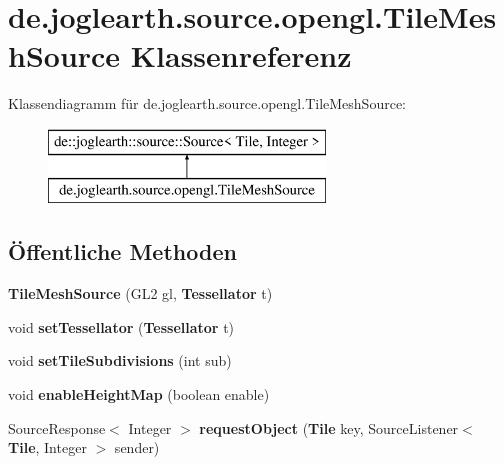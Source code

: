 \section{de.\-joglearth.\-source.\-opengl.\-Tile\-Mesh\-Source Klassenreferenz}
\label{classde_1_1joglearth_1_1source_1_1opengl_1_1_tile_mesh_source}
Klassendiagramm für de.\-joglearth.\-source.\-opengl.\-Tile\-Mesh\-Source\-:\begin{figure}[H]
\begin{center}
\leavevmode
\includegraphics[height=2.000000cm]{classde_1_1joglearth_1_1source_1_1opengl_1_1_tile_mesh_source}
\end{center}
\end{figure}
\subsection*{Öffentliche Methoden}
\begin{DoxyCompactItemize}
\item 
{\bfseries Tile\-Mesh\-Source} (G\-L2 gl, {\bf Tessellator} t)\label{classde_1_1joglearth_1_1source_1_1opengl_1_1_tile_mesh_source_a7610e36972c645245828e121d28d9d0f}

\item 
void {\bfseries set\-Tessellator} ({\bf Tessellator} t)\label{classde_1_1joglearth_1_1source_1_1opengl_1_1_tile_mesh_source_ae5ad4d115c5ff4179f6997c3704e669d}

\item 
void {\bfseries set\-Tile\-Subdivisions} (int sub)\label{classde_1_1joglearth_1_1source_1_1opengl_1_1_tile_mesh_source_a2425d635723774077d58afa9c611ef2d}

\item 
void {\bfseries enable\-Height\-Map} (boolean enable)\label{classde_1_1joglearth_1_1source_1_1opengl_1_1_tile_mesh_source_aa91336e274691a4d17a9939f7d4cf4fd}

\item 
Source\-Response$<$ Integer $>$ {\bfseries request\-Object} ({\bf Tile} key, Source\-Listener$<$ {\bf Tile}, Integer $>$ sender)\label{classde_1_1joglearth_1_1source_1_1opengl_1_1_tile_mesh_source_a5195468c1eab9c681d31bad04abb51a1}

\end{DoxyCompactItemize}
